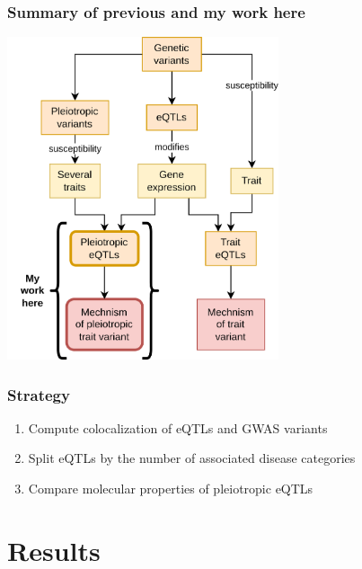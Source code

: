 \documentclass{beamer}
\begin{document}
    \begin{frame}
        \frametitle{Summary of previous and my work here}

        \begin{center}
            \includegraphics[width=0.6\textwidth]{fig/graphical_intro_approach.drawio.png}
        \end{center}

    \end{frame}

    \begin{frame}
        \frametitle{Strategy}

        \begin{enumerate}
            \item Compute colocalization of eQTLs and GWAS variants
            \item Split eQTLs by the number of associated disease categories
            \item Compare molecular properties of pleiotropic eQTLs
        \end{enumerate}

    \end{frame}


    \section{Results} %
\end{document}
